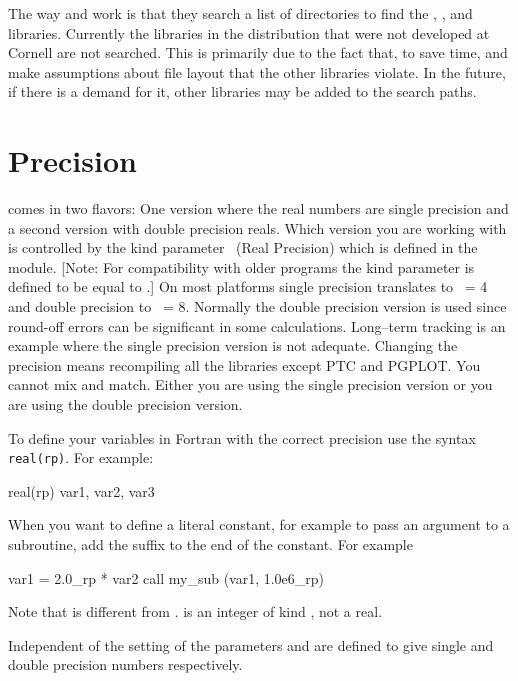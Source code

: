 The way  and  work is that they search a list of
directories to find the \bmad, , and 
libraries. Currently the libraries in the \bmad distribution that were
not developed at Cornell are not searched. This is primarily due to
the fact that, to save time,  and  make assumptions
about file layout that the other libraries violate. In the future, if
there is a demand for it, other libraries may be added to the search
paths.

\section{Precision}
\label{s:precision}

\bmad comes in two flavors: One version where the real numbers are single
precision and a second version with double precision reals. Which
version you are working with is controlled by the kind parameter \
(Real Precision) which is defined in the 
module. [Note: For compatibility with older programs the kind parameter
\vn{rdef} is defined to be equal to .]  On most platforms single
precision translates to \vn{rp}\ = 4 and double precision to \vn{rp}\ =
8. Normally the double precision version is used since round-off
errors can be significant in some calculations. Long--term tracking is
an example where the single precision version is not adequate. Changing 
the precision means recompiling all the libraries except PTC and PGPLOT. 
You cannot mix and match. Either you are using the single precision version
or you are using the double precision version.

To define your variables in Fortran with the correct precision use the syntax
{\tt real(rp)}. For example:
\begin{example}
    real(rp) var1, var2, var3
\end{example}
When you want to define a literal constant, for example to pass an
argument to a subroutine, add the suffix \vn{_rp} to the end of the
constant. For example
\begin{example}
   var1 =  2.0_rp * var2
   call my_sub (var1, 1.0e6_rp)
\end{example}
Note that  is different from .  is an
integer of kind \vn{rp}, not a real.

Independent of the setting of  the parameters  and
\vn{dp} are defined to give single and double precision numbers
respectively.

